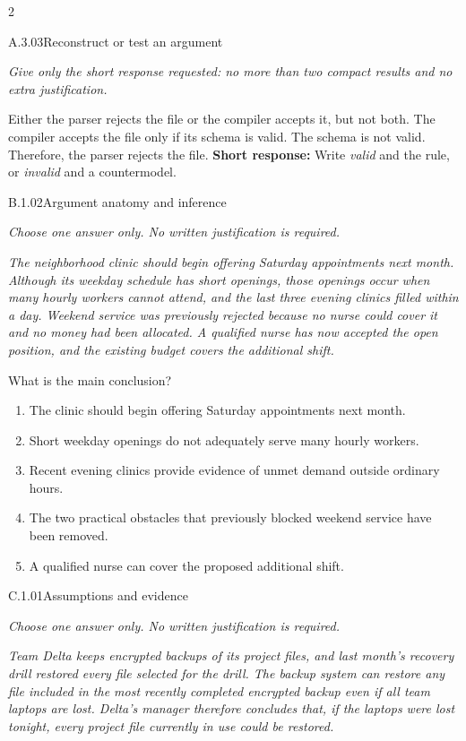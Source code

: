\documentclass[9pt]{extarticle}
\newcommand{\choice}[1]{\item #1}
\begin{document}
\begin{multicols}{2}
\begin{DenseCoreProblem}{A.3.03}{Reconstruct or test an argument}
{\scriptsize\textit{Give only the short response requested: no more than two compact results and no extra justification.}\par}
Either the parser rejects the file or the compiler accepts it, but not both. The compiler accepts the file only if its schema is valid. The schema is not valid. Therefore, the parser rejects the file.
\textbf{Short response:} Write \emph{valid} and the rule, or \emph{invalid} and a countermodel.
\end{DenseCoreProblem}
\begin{DenseCoreProblem}{B.1.02}{Argument anatomy and inference}
{\scriptsize\textit{Choose one answer only. No written justification is required.}\par}
\emph{The neighborhood clinic should begin offering Saturday appointments next month. Although its weekday schedule has short openings, those openings occur when many hourly workers cannot attend, and the last three evening clinics filled within a day. Weekend service was previously rejected because no nurse could cover it and no money had been allocated. A qualified nurse has now accepted the open position, and the existing budget covers the additional shift.}

What is the main conclusion?
\begin{enumerate}[label=(\alph*)]
  \choice{The clinic should begin offering Saturday appointments next month.}
  \choice{Short weekday openings do not adequately serve many hourly workers.}
  \choice{Recent evening clinics provide evidence of unmet demand outside ordinary hours.}
  \choice{The two practical obstacles that previously blocked weekend service have been removed.}
  \choice{A qualified nurse can cover the proposed additional shift.}
\end{enumerate}
\end{DenseCoreProblem}
\columnbreak
\begin{DenseCoreProblem}{C.1.01}{Assumptions and evidence}
{\scriptsize\textit{Choose one answer only. No written justification is required.}\par}
\emph{Team Delta keeps encrypted backups of its project files, and last month's recovery drill restored every file selected for the drill. The backup system can restore any file included in the most recently completed encrypted backup even if all team laptops are lost. Delta's manager therefore concludes that, if the laptops were lost tonight, every project file currently in use could be restored.}


\end{DenseCoreProblem}
\end{multicols}
\end{document}

